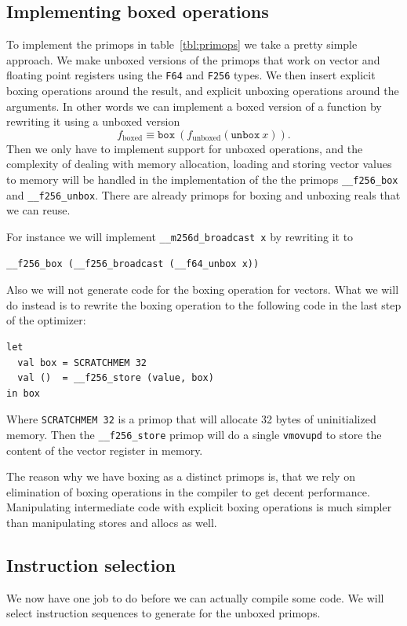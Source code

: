 \documentclass{article}
\begin{document}
\subsection{Implementing boxed operations}

To implement the primops in table~\ref{tbl:primops} we take a pretty simple approach. We make unboxed versions of the primops that work on vector and floating point registers using the \texttt{F64} and \texttt{F256} types. We then insert explicit boxing operations around the result, and explicit unboxing operations around the arguments. In other words we can implement a boxed version of a function by rewriting it using a unboxed version
\[
    f_{\mathrm{boxed}} \equiv \mathtt{box}\ (f_{\mathrm{unboxed}} (\mathtt{unbox}\ x)).
\]
Then we only have to implement support for unboxed operations, and the complexity of dealing with memory allocation, loading and storing vector values to memory will be handled in the implementation of the the primops \verb!__f256_box! and \verb!__f256_unbox!. There are already primops for boxing and unboxing reals that we can reuse.

For instance we will implement \verb!__m256d_broadcast x! by rewriting it to
\begin{verbatim}
__f256_box (__f256_broadcast (__f64_unbox x))
\end{verbatim}
Also we will not generate code for the boxing operation for vectors. What we will do instead is to rewrite the boxing operation to the following code in the last step of the optimizer:
\begin{verbatim}
let
  val box = SCRATCHMEM 32
  val ()  = __f256_store (value, box)
in box
\end{verbatim}
Where \verb!SCRATCHMEM 32! is a primop that will allocate 32 bytes of uninitialized memory. Then the \verb!__f256_store! primop will do a single \verb!vmovupd! to store the content of the vector register in memory.

The reason why we have boxing as a distinct primops is, that we rely on elimination of boxing operations in the compiler to get decent performance. Manipulating intermediate code with explicit boxing operations is much simpler than manipulating stores and allocs as well.

\subsection{Instruction selection}

We now have one job to do before we can actually compile some code. We will select instruction sequences to generate for the unboxed primops.
\end{document}
